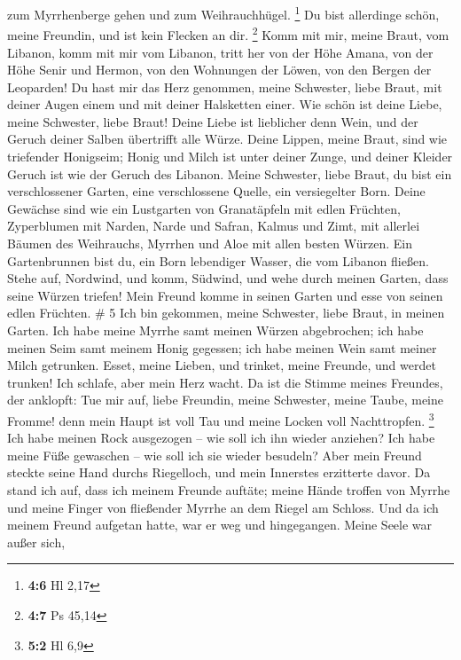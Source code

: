 zum Myrrhenberge gehen und zum Weihrauchhügel. \footnote{\textbf{4:6} Hl
  2,17}  Du bist allerdinge schön, meine Freundin, und ist
kein Flecken an dir. \footnote{\textbf{4:7} Ps 45,14}  Komm
mit mir, meine Braut, vom Libanon, komm mit mir vom Libanon, tritt her
von der Höhe Amana, von der Höhe Senir und Hermon, von den Wohnungen der
Löwen, von den Bergen der Leoparden!  Du hast mir das Herz
genommen, meine Schwester, liebe Braut, mit deiner Augen einem und mit
deiner Halsketten einer.  Wie schön ist deine Liebe, meine
Schwester, liebe Braut! Deine Liebe ist lieblicher denn Wein, und der
Geruch deiner Salben übertrifft alle Würze.  Deine Lippen,
meine Braut, sind wie triefender Honigseim; Honig und Milch ist unter
deiner Zunge, und deiner Kleider Geruch ist wie der Geruch des Libanon.
 Meine Schwester, liebe Braut, du bist ein verschlossener
Garten, eine verschlossene Quelle, ein versiegelter Born. 
Deine Gewächse sind wie ein Lustgarten von Granatäpfeln mit edlen
Früchten, Zyperblumen mit Narden,  Narde und Safran, Kalmus
und Zimt, mit allerlei Bäumen des Weihrauchs, Myrrhen und Aloe mit allen
besten Würzen.  Ein Gartenbrunnen bist du, ein Born
lebendiger Wasser, die vom Libanon fließen.  Stehe auf,
Nordwind, und komm, Südwind, und wehe durch meinen Garten, dass seine
Würzen triefen! Mein Freund komme in seinen Garten und esse von seinen
edlen Früchten. \# 5  Ich bin gekommen, meine Schwester,
liebe Braut, in meinen Garten. Ich habe meine Myrrhe samt meinen Würzen
abgebrochen; ich habe meinen Seim samt meinem Honig gegessen; ich habe
meinen Wein samt meiner Milch getrunken. Esset, meine Lieben, und
trinket, meine Freunde, und werdet trunken!  Ich schlafe,
aber mein Herz wacht. Da ist die Stimme meines Freundes, der anklopft:
Tue mir auf, liebe Freundin, meine Schwester, meine Taube, meine Fromme!
denn mein Haupt ist voll Tau und meine Locken voll Nachttropfen.
\footnote{\textbf{5:2} Hl 6,9}  Ich habe meinen Rock
ausgezogen -- wie soll ich ihn wieder anziehen? Ich habe meine Füße
gewaschen -- wie soll ich sie wieder besudeln?  Aber mein
Freund steckte seine Hand durchs Riegelloch, und mein Innerstes
erzitterte davor.  Da stand ich auf, dass ich meinem Freunde
auftäte; meine Hände troffen von Myrrhe und meine Finger von fließender
Myrrhe an dem Riegel am Schloss.  Und da ich meinem Freund
aufgetan hatte, war er weg und hingegangen. Meine Seele war außer sich,
